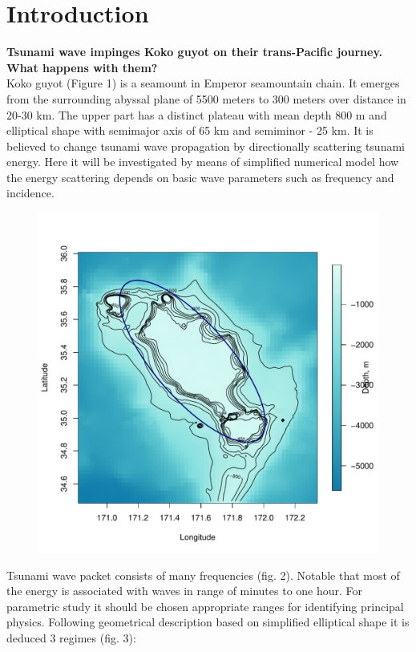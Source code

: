 \section{Introduction}
\textbf{Tsunami wave impinges Koko guyot on their trans-Pacific journey. What happens with them?}\\
Koko guyot (Figure 1) is a seamount in Emperor seamountain chain. It emerges from the surrounding abyssal plane of 5500 meters to 300 meters over distance in 20-30 km. The upper part has a distinct plateau with mean depth 800 m and elliptical shape with semimajor axis of 65 km and semiminor - 25 km. It is believed to change tsunami wave propagation by directionally scattering tsunami energy. Here it will be investigated by means of simplified numerical model how the energy scattering depends on basic wave parameters such as frequency and incidence.
\begin{figure}[h]
\centering
\includegraphics[scale=0.5]{../figures/koko_ell.pdf}
\end{figure}
Tsunami wave packet consists of many frequencies (fig. 2). Notable that most of the energy is associated with waves in range of minutes to one hour. For parametric study it should be chosen appropriate ranges for identifying principal physics. Following geometrical description based on simplified elliptical shape it is deduced 3 regimes (fig. 3):
